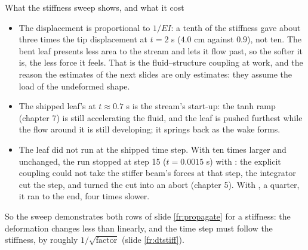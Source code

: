 \documentclass[aspectratio=169,11pt]{beamer}
\begin{document}
\begin{frame}{What the stiffness sweep shows, and what it cost}
\label{fr:kbsweep2}
\footnotesize
\begin{itemize}
  \item The displacement is  proportional to $1/EI$: a tenth of the stiffness gave about three times the tip displacement at $t = 2$ s ($4.0$ cm against $0.9$), not ten. The bent leaf presents less area to the stream and lets it flow past, so the softer it is, the less force it feels. That is the fluid--structure coupling at work, and the reason the estimates of the next slides are only estimates: they assume the load of the undeformed shape.
  \item The shipped leaf's  at $t \approx 0.7$ s is the stream's start-up: the tanh ramp (chapter 7) is still accelerating the fluid, and the leaf is pushed furthest while the flow around it is still developing; it springs back as the wake forms.
  \item The  leaf did not run at the shipped time step. With  ten times larger and  unchanged, the run stopped at step 15 ($t = 0.0015$ s) with : the explicit coupling could not take the stiffer beam's forces at that step, the integrator cut the step, and  turned the cut into an abort (chapter 5). With , a quarter, it ran to the end, four times slower.
\end{itemize}
\vspace{1mm}
\begin{punchbox}
\small So the sweep demonstrates both rows of slide \ref{fr:propagate} for a stiffness: the deformation changes less than linearly, and the time step must follow the stiffness, by roughly $1/\sqrt{\text{factor}}$ (slide \ref{fr:dtstiff}).
\end{punchbox}
\end{frame}
\end{document}
